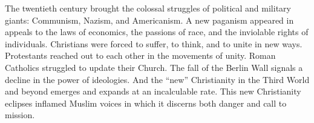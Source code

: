 
\begin{partsummary}
The twentieth century brought the colossal struggles of political and military giants: Communism,
Nazism, and Americanism. A new paganism appeared in appeals to the laws of economics, the passions
of race, and the inviolable rights of individuals. Christians were forced to suffer, to think, and
to unite in new ways. Protestants reached out to each other in the movements of unity. Roman
Catholics struggled to update their Church. The fall of the Berlin Wall signals a decline in the
power of ideologies. And the “new” Christianity in the Third World and beyond emerges and expands at
an incalculable rate. This new Christianity eclipses inflamed Muslim voices in which it discerns
both danger and call to mission.
\end{partsummary}

